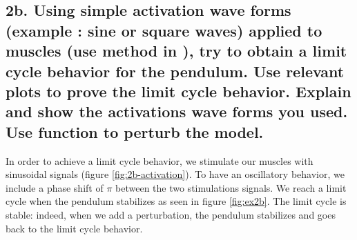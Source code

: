 \documentclass{cmc}
\begin{document}
\subsection*{2b. Using simple activation wave forms (example : sine or
  square waves) applied to muscles (use
   method in
  ), try to obtain a limit cycle behavior for
  the pendulum. Use relevant plots to prove the limit cycle behavior.
  Explain and show the activations wave forms you used. Use
  \newline {} function to perturb the model.}
\label{sec:2c}
In order to achieve a limit cycle behavior, we stimulate our muscles with sinusoidal signals (figure \ref{fig:2b-activation}). To have an oscillatory behavior, we include a phase shift of $\pi$ between the two stimulations signals. We reach a limit cycle when the pendulum stabilizes as seen in figure \ref{fig:ex2b}. The limit cycle is stable: indeed, when we add a perturbation, the pendulum stabilizes and goes back to the limit cycle behavior. 
\end{document}
